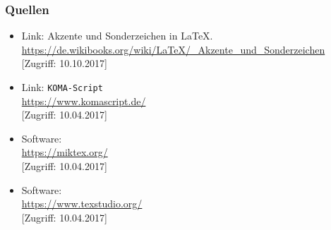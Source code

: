 \documentclass[a4paper,10pt, bibtotoc]{beamer}
\begin{document}
\begin{frame}[allowframebreaks]
\frametitle{Quellen}

{\footnotesize
	
	\begin{itemize}

		
		\item Link: Akzente und Sonderzeichen in \LaTeX .\\
		\url{https://de.wikibooks.org/wiki/LaTeX/_Akzente_und_Sonderzeichen}\\
		{[}Zugriff: 10.10.2017]

		\item Link: \texttt{KOMA-Script}\\
		\url{https://www.komascript.de/}\\
		{[}Zugriff: 10.04.2017]

		\item Software: \\
		\url{https://miktex.org/} \\
		{[}Zugriff: 10.04.2017]
		
		\item Software: \\
		\url{https://www.texstudio.org/} \\
		{[}Zugriff: 10.04.2017]
		
%		
%		
%		
%		
		
	\end{itemize}
}

\end{frame}
\end{document}
